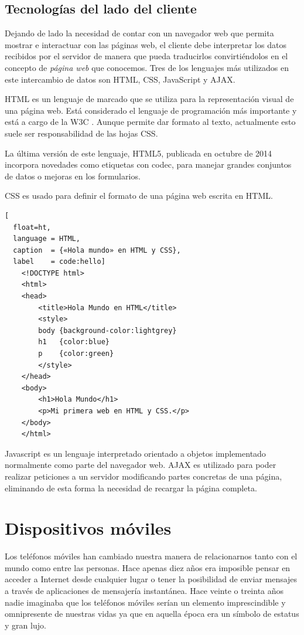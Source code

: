 \subsection{Tecnologías del lado del cliente}
Dejando de lado la necesidad de contar con un navegador web que permita mostrar e interactuar con las páginas web, el cliente debe interpretar los datos recibidos por el servidor de manera que pueda traducirlos convirtiéndolos en el concepto de \textit{página web} que conocemos. Tres de los lenguajes más utilizados en este intercambio de datos son \ac{HTML}, \ac{CSS}, JavaScript y \ac{AJAX}.

\ac{HTML} es un lenguaje de marcado que se utiliza para la representación visual de una página web. Está considerado el lenguaje de programación más importante y está a cargo de la W3C \cite{Worl15}. Aunque permite dar formato al texto, actualmente esto suele ser responsabilidad de las hojas \ac{CSS}.

La última versión de este lenguaje, \ac{HTML}5, publicada en octubre de 2014 \cite{Adam14} incorpora novedades como etiquetas con \ac{codec}, para manejar grandes conjuntos de datos o mejoras en los formularios.

\ac{CSS} es usado para definir el formato de una página web escrita en \ac{HTML}.

\begin{lstlisting}[
  float=ht,
  language = HTML,
  caption  = {«Hola mundo» en HTML y CSS},
  label    = code:hello]
	<!DOCTYPE html>
	<html>
	<head>
	    <title>Hola Mundo en HTML</title>
		<style>
		body {background-color:lightgrey}
		h1   {color:blue}
		p    {color:green}
		</style>
	</head>
	<body>
		<h1>Hola Mundo</h1>
		<p>Mi primera web en HTML y CSS.</p>
	</body>
	</html>
\end{lstlisting}

Javascript es un lenguaje interpretado orientado a objetos implementado normalmente como parte del navegador web.
 \ac{AJAX} es utilizado para poder realizar peticiones a un servidor modificando partes concretas de una página, eliminando de esta forma la necesidad de recargar la página completa.



\section{Dispositivos móviles}
Los teléfonos móviles han cambiado nuestra manera de relacionarnos tanto con el mundo como entre las personas. Hace apenas diez años era imposible pensar en acceder a Internet desde cualquier lugar o tener la posibilidad de enviar mensajes a través de 
aplicaciones de mensajería instantánea. Hace veinte o treinta años nadie imaginaba que los teléfonos móviles serían un elemento imprescindible y omnipresente de nuestras vidas ya que en aquella época era un símbolo de estatus y gran lujo.

